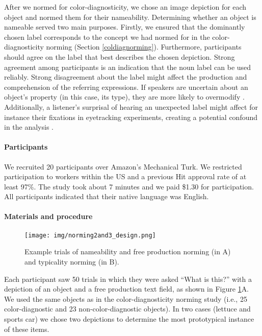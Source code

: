 \documentclass[a4paper,man,floatsintext,natbib,donotrepeattitle]{apa6}
\begin{document}
After we normed for color-diagnosticity, we chose an image depiction for each object and normed them for their nameability. Determining whether an object is nameable served two main purposes. Firstly, we ensured that the dominantly chosen label corresponds to the concept we had normed for in the color-diagnosticity norming (Section \ref{coldiagnorming}). Furthermore, participants should agree on the label that best describes the chosen depiction. Strong agreement among participants is an indication that the noun label can be used reliably. Strong disagreement about the label might affect the production and comprehension of the referring expressions. If speakers are uncertain about an object's property (in this case, its type), they are more likely to overmodify \citep{Horacek:2005, Williams:2017}. Additionally, a listener's surprisal of hearing an unexpected label might affect for instance their fixations in eyetracking experiments, creating a potential confound in the analysis \citep{Qing:2018}.

\paragraph{Participants}
We recruited 20 participants over Amazon's Mechanical Turk. We restricted participation to workers within the US and a previous Hit approval rate of at least 97\%. The study took about 7 minutes and we paid \$1.30 for participation. All participants indicated that their native language was English.

\paragraph{Materials and procedure}

\begin{figure}
	\texttt{[image: img/norming2and3\_design.png]}
	\caption{Example trials of nameability and free production norming (in A) and typicality norming (in B).}
	\label{fig:norming23design}
\end{figure}

Each participant saw 50 trials in which they were asked ``What is this?'' with a depiction of an object and a free production text field, as shown in Figure \ref{fig:norming23design}A.
We used the same objects as in the color-diagnosticity norming study (i.e., 25 color-diagnostic and 23 non-color-diagnostic objects). In two cases (lettuce and sports car) we chose two depictions to determine the most prototypical instance of these items.
\end{document}
